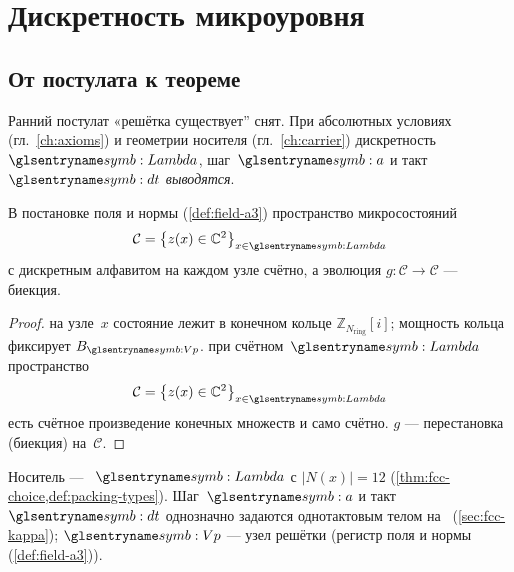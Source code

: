 \chapter{Дискретность микроуровня}
\label{ch:foundations}

\section{От постулата к теореме}

Ранний постулат «решётка существует'' снят.
При абсолютных условиях (гл.~\ref{ch:axioms}) и геометрии носителя (гл.~\ref{ch:carrier})
дискретность~$\carrierLattice$, шаг~$\caStepSpace$ и такт~$\htick$ \emph{выводятся}.

\begin{lemma}
\label{lem:countable-config}
В постановке поля и нормы (\cref{def:field-a3}) пространство микросостояний
\[
  \mathcal{C}=\bigl\{z(x)\in\mathbb{C}^2\bigr\}_{x\in\carrierLattice}
\]
с дискретным алфавитом на каждом узле счётно, а эволюция $g:\mathcal{C}\to\mathcal{C}$ --- биекция.
\end{lemma}

\begin{proof}
на узле~$x$ состояние лежит в конечном кольце $\mathbb{Z}_{N_{\mathrm{ring}}}[i]$;
мощность кольца фиксирует $B_{\hv}$.
\phence при счётном~$\carrierLattice$ пространство
\[
  \mathcal{C}=\bigl\{z(x)\in\mathbb{C}^2\bigr\}_{x\in\carrierLattice}
\]
есть счётное произведение конечных множеств и само счётно.
$g$ --- перестановка (биекция) на~$\mathcal{C}$.
\end{proof}

\begin{lemma}
\label{lem:fcc-scale}
Носитель --- \latGCK\ $\carrierLattice$ с $|N(x)|=12$ (\cref{thm:fcc-choice,def:packing-types}).
Шаг~$\caStepSpace$ и такт~$\htick$ однозначно задаются однотактовым телом на \latGCKshort\ (\cref{sec:fcc-kappa});
$\hv$ --- узел решётки (регистр поля и нормы (\cref{def:field-a3})).
\end{lemma}

